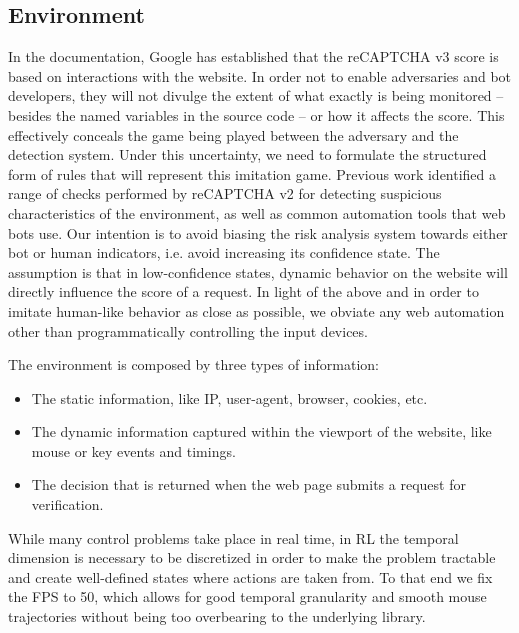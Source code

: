 \subsection{Environment}

In the documentation, Google has established that the reCAPTCHA v3 score is based on interactions with the website.
In order not to enable adversaries and bot developers, they will not divulge the extent of what exactly is being monitored -- besides the named variables in the source code -- or how it affects the score.
This effectively conceals the game being played between the adversary and the detection system.
Under this uncertainty, we need to formulate the structured form of rules that will represent this imitation game.
Previous work \cite{sivakorn2016robot, li2021good} identified a range of checks performed by reCAPTCHA v2 for detecting suspicious characteristics of the environment, as well as common automation tools that web bots use.
Our intention is to avoid biasing the risk analysis system towards either bot or human indicators, i.e. avoid increasing its confidence state.
The assumption is that in low-confidence states, dynamic behavior on the website will directly influence the score of a request. 
In light of the above and in order to imitate human-like behavior as close as possible, we obviate any web automation other than programmatically controlling the input devices.

The environment is composed by three types of information:
\begin{itemize}
  \item The static information, like IP, user-agent, browser, cookies, etc.
  \item The dynamic information captured within the viewport of the website, like mouse or key events and timings.
  \item The decision that is returned when the web page submits a request for verification.
 \end{itemize}

While many control problems take place in real time, in \gls{RL} the temporal dimension is necessary to be discretized in order to make the problem tractable and create well-defined states where actions are taken from.
To that end we fix the \gls{FPS} to 50, which allows for good temporal granularity and smooth mouse trajectories without being too overbearing to the underlying library.

